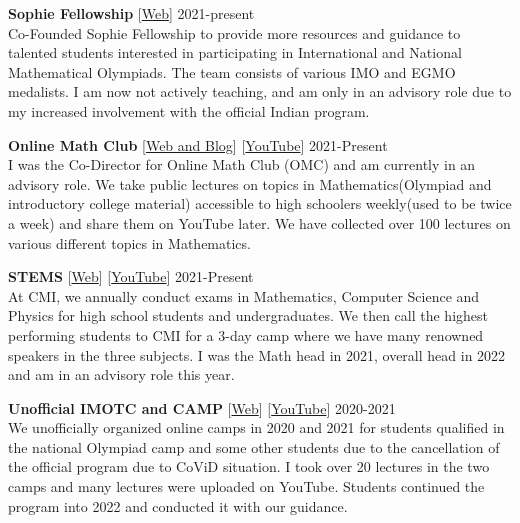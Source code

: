 \documentclass[margin,line, 10pt]{res}
\begin{document}
\begin{resume}
{\bf Sophie Fellowship}{\hspace{1em} [\href{https://www.sophiefellowship.in/}{Web}]}  \hfill 2021-present\\
Co-Founded Sophie Fellowship to provide more resources and guidance to talented students interested in participating in International and National Mathematical Olympiads. The team consists of various IMO and EGMO medalists. I am now not actively teaching, and am only in an advisory role due to my increased involvement with the official Indian program.

{\textbf {Online Math Club}}{ \hspace{1em} [\href{https://omath.club/}{Web and Blog}] \hspace{0.4em} [\href{https://www.youtube.com/@OMath/videos}{YouTube}]} \hfill 2021-Present\\
I was the Co-Director for Online Math Club (OMC) and am currently in an advisory role. We take public lectures on topics in Mathematics(Olympiad and introductory college material) accessible to high schoolers weekly(used to be twice a week) and share them on YouTube later. We have collected over 100 lectures on various different topics in Mathematics. 

{\bf STEMS}{\hspace{1em} [\href{https://www.tessellate.cmi.ac.in/stems}{Web}]\hspace{0.4em} [\href{https://www.youtube.com/@TessellateCMI}{YouTube}]} \hfill 2021-Present\\
At CMI, we annually conduct exams in Mathematics, Computer Science and Physics for high school students and undergraduates. We then call the highest performing students to CMI for a 3-day camp where we have many renowned speakers in the three subjects. I was the Math head in 2021, overall head in 2022 and am in an advisory role this year.

{\bf Unofficial IMOTC and CAMP}{\hspace{1em} [\href{https://sites.google.com/view/campamp/home}{Web}]\hspace{0.4em} [\href{https://www.youtube.com/@campforadvancedmathematica4861}{YouTube}]} \hfill 2020-2021 \\
We unofficially organized online camps in 2020 and 2021 for students qualified in the national Olympiad camp and some other students due to the cancellation of the official program due to CoViD situation. I took over 20 lectures in the two camps and many lectures were uploaded on YouTube. Students continued the program into 2022 and conducted it with our guidance.


\end{resume}
\end{document}
